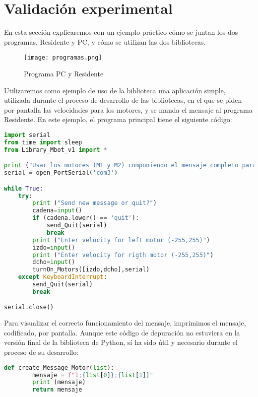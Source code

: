 \section{Validación experimental}\label{sec:resultado}
En esta sección explicaremos con un ejemplo práctico cómo se juntan los dos programas, Residente y PC, y cómo se utilizan las dos bibliotecas. \\

\begin{figure}[h]
	\centering
	\texttt{[image: programas.png]}
	\label{img:Mix}
	\caption{Programa PC y Residente}
\end{figure} 
\vspace{1cm}
Utilizaremos como ejemplo de uso de la biblioteca una aplicación simple, utilizada durante el proceso de desarrollo de las bibliotecas, en el que se piden por pantalla las velocidades para los motores, y se manda el mensaje al programa Residente. En este ejemplo, el programa principal tiene el siguiente código:
\begin{lstlisting}[language=python,caption={Ejemplo de uso de PyBoKids 2.0},captionpos=b]
import serial
from time import sleep
from Library_Mbot_v1 import *

print ("Usar los motores (M1 y M2) componiendo el mensaje completo para mandar exactamente los valores")
serial = open_PortSerial('com3')

while True:
	try:
		print ("Send new message or quit?")
		cadena=input()
		if (cadena.lower() == 'quit'):
			send_Quit(serial)
			break
		print ("Enter velocity for left motor (-255,255)")
		izdo=input()
		print ("Enter velocity for rigth motor (-255,255)")
		dcho=input()
		turnOn_Motors([izdo,dcho],serial)
	except KeyboardInterrupt:
		send_Quit(serial)
		break

serial.close()
\end{lstlisting}

Para visualizar el correcto funcionamiento del mensaje, imprimimos el mensaje, codificado, por pantalla. Aunque este código de depuración no estuviera en la versión final de la biblioteca de Python, sí ha sido útil y necesario durante el proceso de su desarrollo:

\begin{lstlisting}[language=python,caption={Uso de la bibliotca durante su desarrollo, con depuración de código},captionpos=b]
	def create_Message_Motor(list):
		mensaje = f"1;{list[0]};{list[1]}"
		print (mensaje)
		return mensaje
\end{lstlisting}

